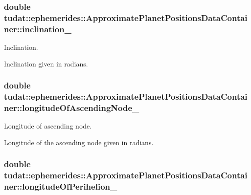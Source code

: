 \subsubsection[{\texorpdfstring{inclination\+\_\+}{inclination_}}]{\setlength{\rightskip}{0pt plus 5cm}double tudat\+::ephemerides\+::\+Approximate\+Planet\+Positions\+Data\+Container\+::inclination\+\_\+}\hypertarget{structtudat_1_1ephemerides_1_1ApproximatePlanetPositionsDataContainer_aab4e267bda985e1e9ce56aabffc94246}{}\label{structtudat_1_1ephemerides_1_1ApproximatePlanetPositionsDataContainer_aab4e267bda985e1e9ce56aabffc94246}


Inclination. 

Inclination given in radians. 
\subsubsection[{\texorpdfstring{longitude\+Of\+Ascending\+Node\+\_\+}{longitudeOfAscendingNode_}}]{\setlength{\rightskip}{0pt plus 5cm}double tudat\+::ephemerides\+::\+Approximate\+Planet\+Positions\+Data\+Container\+::longitude\+Of\+Ascending\+Node\+\_\+}\hypertarget{structtudat_1_1ephemerides_1_1ApproximatePlanetPositionsDataContainer_acdc92f2358fb6d9ebbedbd6f694c3bc1}{}\label{structtudat_1_1ephemerides_1_1ApproximatePlanetPositionsDataContainer_acdc92f2358fb6d9ebbedbd6f694c3bc1}


Longitude of ascending node. 

Longitude of the ascending node given in radians. 
\subsubsection[{\texorpdfstring{longitude\+Of\+Perihelion\+\_\+}{longitudeOfPerihelion_}}]{\setlength{\rightskip}{0pt plus 5cm}double tudat\+::ephemerides\+::\+Approximate\+Planet\+Positions\+Data\+Container\+::longitude\+Of\+Perihelion\+\_\+}\hypertarget{structtudat_1_1ephemerides_1_1ApproximatePlanetPositionsDataContainer_adbbfbfbce7f44d3291c6ea71255f4757}{}\label{structtudat_1_1ephemerides_1_1ApproximatePlanetPositionsDataContainer_adbbfbfbce7f44d3291c6ea71255f4757}


